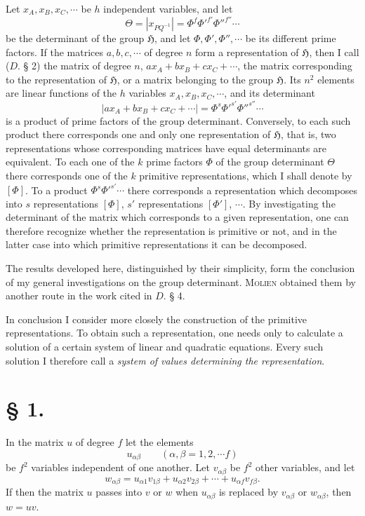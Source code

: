 \documentclass[11pt]{article}
\newcommand{\Hgr}{\mathfrak{H}}
\begin{document}
Let $x_A,x_B,x_C,\cdots$ be $h$ independent variables, and let
\[
\Theta=|x_{PQ^{-1}}|=\Phi^f{\Phi'}^{f'}{\Phi''}^{f''}\cdots
\]
be the determinant of the group $\Hgr$, and let $\Phi,\Phi',\Phi'',\cdots$ be its different prime factors. If the matrices $a,b,c,\cdots$ of degree $n$ form a representation of $\Hgr$, then I call ($D.$ § 2) the matrix of degree $n$, $ax_A+bx_B+cx_C+\cdots$, the matrix corresponding to the representation of $\Hgr$, or a matrix belonging to the group $\Hgr$. Its $n^2$ elements are linear functions of the $h$ variables $x_A,x_B,x_C,\cdots$, and its determinant
\[
|ax_A+bx_B+cx_C+\cdots|=\Phi^s{\Phi'}^{s'}{\Phi''}^{s''}\cdots
\]
is a product of prime factors of the group determinant. Conversely, to each such product there corresponds one and only one representation of $\Hgr$, that is, two representations whose corresponding matrices have equal determinants are equivalent. To each one of the $k$ prime factors $\Phi$ of the group determinant $\Theta$ there corresponds one of the $k$ primitive representations, which I shall denote by $[\Phi]$. To a product $\Phi^s{\Phi'}^{s'}\cdots$ there corresponds a representation which decomposes into $s$ representations $[\Phi]$, $s'$ representations $[\Phi']$, $\cdots$. By investigating the determinant of the matrix which corresponds to a given representation, one can therefore recognize whether the representation is primitive or not, and in the latter case into which primitive representations it can be decomposed.

The results developed here, distinguished by their simplicity, form the conclusion of my general investigations on the group determinant. \textsc{Molien} obtained them by another route in the work cited in $D.$ § 4.

In conclusion I consider more closely the construction of the primitive representations. To obtain such a representation, one needs only to calculate a solution of a certain system of linear and quadratic equations. Every such solution I therefore call a \emph{system of values determining the representation}.

\section*{§ 1.}

In the matrix $u$ of degree $f$ let the elements
\[
u_{\alpha\beta}\qquad(\alpha,\beta=1,2,\cdots f)
\]
be $f^2$ variables independent of one another. Let $v_{\alpha\beta}$ be $f^2$ other variables, and let
\[
w_{\alpha\beta}=u_{\alpha1}v_{1\beta}+u_{\alpha2}v_{2\beta}+\cdots+u_{\alpha f}v_{f\beta}.
\]
If then the matrix $u$ passes into $v$ or $w$ when $u_{\alpha\beta}$ is replaced by $v_{\alpha\beta}$ or $w_{\alpha\beta}$, then $w=uv$.
\end{document}
